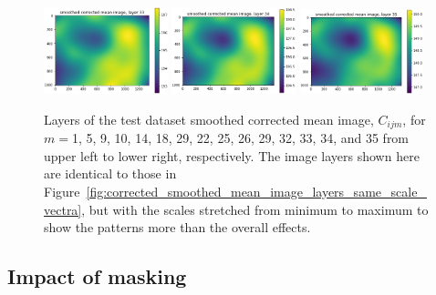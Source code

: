 \documentclass[letterpaper,11pt]{article}
\newcommand{\reffig}[1]{Figure~\ref{#1}}
\begin{document}
\begin{figure}[!ht]
\includegraphics[width=0.32\textwidth]{images/results/smoothed_corrected_mean_image_layers/smoothed_corrected_mean_image_layer_33}
\includegraphics[width=0.32\textwidth]{images/results/smoothed_corrected_mean_image_layers/smoothed_corrected_mean_image_layer_34}
\includegraphics[width=0.32\textwidth]{images/results/smoothed_corrected_mean_image_layers/smoothed_corrected_mean_image_layer_35}
\caption{\footnotesize Layers of the test dataset smoothed corrected mean image, $C_{ijm}$, for $m=$1, 5, 9, 10, 14, 18, 29, 22, 25, 26, 29, 32, 33, 34, and 35 from upper left to lower right, respectively. The image layers shown here are identical to those in \reffig{fig:corrected_smoothed_mean_image_layers_same_scale_vectra}, but with the scales stretched from minimum to maximum to show the patterns more than the overall effects.}
\label{fig:corrected_smoothed_mean_image_layers_vectra}
\end{figure}

\subsection{Impact of masking}
\label{ssec:impact_of_masking}
\end{document}
